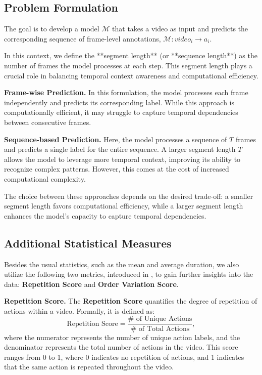 \subsection{Problem Formulation}
The goal is to develop a model $\mathcal{M}$ that takes a video as input and predicts the corresponding sequence of frame-level annotations, $\mathcal{M} : video_i \rightarrow a_i$. 

In this context, we define the **segment length** (or **sequence length**) as the number of frames the model processes at each step. This segment length plays a crucial role in balancing temporal context awareness and computational efficiency.

\noindent\textbf{Frame-wise Prediction.}
In this formulation, the model processes each frame independently and predicts its corresponding label. While this approach is computationally efficient, it may struggle to capture temporal dependencies between consecutive frames.

\noindent\textbf{Sequence-based Prediction.}
Here, the model processes a sequence of $T$ frames and predicts a single label for the entire sequence. A larger segment length $T$ allows the model to leverage more temporal context, improving its ability to recognize complex patterns. However, this comes at the cost of increased computational complexity.

The choice between these approaches depends on the desired trade-off: a smaller segment length favors computational efficiency, while a larger segment length enhances the model's capacity to capture temporal dependencies.

\subsection{Additional Statistical Measures}

Besides the usual statistics, such as the mean and average duration, we also utilize the following two metrics, introduced in \cite{tas-survey}, to gain further insights into the data: \textbf{Repetition Score} and \textbf{Order Variation Score}.

\noindent\textbf{Repetition Score.}  
The \textbf{Repetition Score} quantifies the degree of repetition of actions within a video. Formally, it is defined as:
$$
\text{Repetition Score} = \frac{\# \text{ of Unique Actions}}{\# \text{ of Total Actions}},
$$
where the numerator represents the number of unique action labels, and the denominator represents the total number of actions in the video. This score ranges from 0 to 1, where 0 indicates no repetition of actions, and 1 indicates that the same action is repeated throughout the video.

